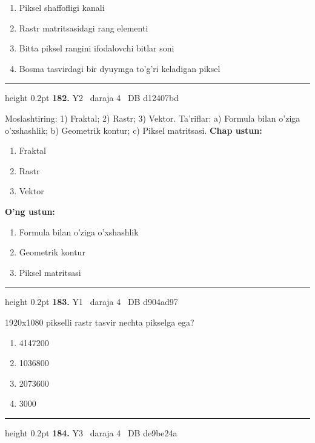 \documentclass[10pt,a4paper,oneside]{article}
\begin{document}
\begin{enumerate}[label=\Alph*),leftmargin=9mm]
\item Piksel shaffofligi kanali
\item Rastr matritsasidagi rang elementi
\item Bitta piksel rangini ifodalovchi bitlar soni
\item Bosma tasvirdagi bir dyuymga to'g'ri keladigan piksel
\end{enumerate}
\vspace{2mm}\hrule height 0.2pt \vspace{4mm}
\hypertarget{q182}{\textbf{\color{ink}182.}}  {\color{muted}\scriptsize Y2 \textbullet\ daraja 4 \textbullet\ DB d12407bd}
\par
Moslashtiring: 1) Fraktal; 2) Rastr; 3) Vektor. Ta'riflar: a) Formula bilan o'ziga o'xshashlik; b) Geometrik kontur; c) Piksel matritsasi.
\textbf{\footnotesize Chap ustun:}
\begin{enumerate}[label=\arabic*),leftmargin=9mm]
\item Fraktal
\item Rastr
\item Vektor
\end{enumerate}
\textbf{\footnotesize O'ng ustun:}
\begin{enumerate}[label=\Alph*),leftmargin=9mm]
\item Formula bilan o'ziga o'xshashlik
\item Geometrik kontur
\item Piksel matritsasi
\end{enumerate}
\vspace{2mm}\hrule height 0.2pt \vspace{4mm}
\hypertarget{q183}{\textbf{\color{ink}183.}}  {\color{muted}\scriptsize Y1 \textbullet\ daraja 4 \textbullet\ DB d904ad97}
\par
1920x1080 pikselli rastr tasvir nechta pikselga ega?
\begin{enumerate}[label=\Alph*),leftmargin=9mm]
\item 4147200
\item 1036800
\item 2073600
\item 3000
\end{enumerate}
\vspace{2mm}\hrule height 0.2pt \vspace{4mm}
\hypertarget{q184}{\textbf{\color{ink}184.}}  {\color{muted}\scriptsize Y3 \textbullet\ daraja 4 \textbullet\ DB de9be24a}
\end{document}
